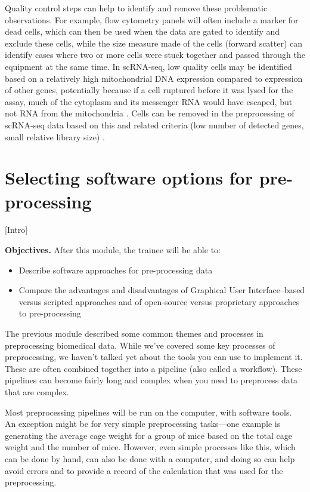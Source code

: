 \documentclass[]{tufte-book}
\providecommand{\tightlist}{%
  \setlength{\itemsep}{0pt}\setlength{\parskip}{0pt}}
\begin{document}
Quality control steps can help to identify and remove these problematic
observations. For example, flow cytometry panels will often include a marker for
dead cells, which can then be used when the data are gated to identify and
exclude these cells, while the size measure made of the cells (forward scatter)
can identify cases where two or more cells were stuck together and passed
through the equipment at the same time. In scRNA-seq, low quality cells may be
identified based on a relatively high mitochondrial DNA expression compared to
expression of other genes, potentially because if a cell ruptured before it was
lysed for the assay, much of the cytoplasm and its messenger RNA would have
escaped, but not RNA from the mitochondria \citep{ilicic2016classification}. Cells
can be removed in the preprocessing of scRNA-seq data based on this and related
criteria (low number of detected genes, small relative library size)
\citep{ilicic2016classification}.

\section{Selecting software options for pre-processing}\label{module12a}

{[}Intro{]}

\textbf{Objectives.} After this module, the trainee will be able to:

\begin{itemize}
\tightlist
\item
  Describe software approaches for pre-processing data
\item
  Compare the advantages and disadvantages of Graphical User Interface--based
  versus scripted approaches and of open-source versus proprietary approaches
  to pre-processing
\end{itemize}

The previous module described some common themes and processes in preprocessing
biomedical data. While we've covered some key processes of preprocessing, we
haven't talked yet about the tools you can use to implement it. These are often
combined together into a pipeline (also called a workflow). These pipelines can
become fairly long and complex when you need to preprocess data that are
complex.

Most preprocessing pipelines will be run on the computer, with software tools. An
exception might be for very simple preprocessing tasks---one example is
generating the average cage weight for a group of mice based on the total cage
weight and the number of mice. However, even simple processes like this, which
can be done by hand, can also be done with a computer, and doing so can help
avoid errors and to provide a record of the calculation that was used for the
preprocessing.
\end{document}
